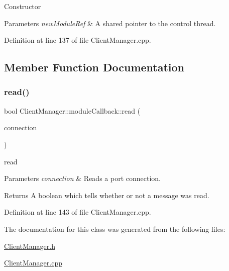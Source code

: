 Constructor 
\begin{DoxyParams}{Parameters}
{\em new\+Module\+Ref} & A shared pointer to the control thread. \\
\hline
\end{DoxyParams}


Definition at line 137 of file Client\+Manager.\+cpp.



\subsection{Member Function Documentation}
\hypertarget{classocra__recipes_1_1ClientManager_1_1moduleCallback_a728d0037e1552bf3ca6152d6b638f30c}{}\label{classocra__recipes_1_1ClientManager_1_1moduleCallback_a728d0037e1552bf3ca6152d6b638f30c} 
\subsubsection{\texorpdfstring{read()}{read()}}
{\footnotesize\ttfamily bool Client\+Manager\+::module\+Callback\+::read (\begin{DoxyParamCaption}\item[{yarp\+::os\+::\+Connection\+Reader \&}]{connection }\end{DoxyParamCaption})\hspace{0.3cm}{\ttfamily [virtual]}}

read 
\begin{DoxyParams}{Parameters}
{\em connection} & Reads a port connection.\\
\hline
\end{DoxyParams}
\begin{DoxyReturn}{Returns}
A boolean which tells whether or not a message was read. 
\end{DoxyReturn}


Definition at line 143 of file Client\+Manager.\+cpp.



The documentation for this class was generated from the following files\+:\begin{DoxyCompactItemize}
\item 
\hyperlink{ClientManager_8h}{Client\+Manager.\+h}\item 
\hyperlink{ClientManager_8cpp}{Client\+Manager.\+cpp}\end{DoxyCompactItemize}

